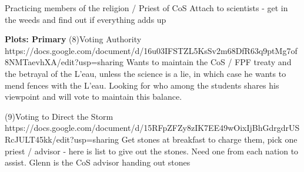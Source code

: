 \documentclass[char]{GL2020}
\begin{document}
\name{\cTest{}}








Practicing members of the religion / Priest of CoS	Attach to scientists - get in the weeds and find out if everything adds up

\textbf{Plots: Primary}
(8)Voting Authority
https://docs.google.com/document/d/16u03IFSTZL5KsSv2m68DfR63q9ptMg7of8NMTaevhXA/edit?usp=sharing
 Wants to maintain the CoS / FPF treaty and the betrayal of the L’eau, unless the science is a lie, in which case he wants to mend fences with the L’eau.  Looking for who among the students shares his viewpoint and will vote to maintain this balance.  

(9)Voting to Direct the Storm
https://docs.google.com/document/d/15RFpZFZy8zIK7EE49wOixIjBhGdrgdrUSRcJULT45kk/edit?usp=sharing
Get stones at breakfast to charge them, pick one priest / advisor - here is list to give out the stones.  Need one from each nation to assist.  Glenn is the CoS advisor handing out stones
\end{document}
